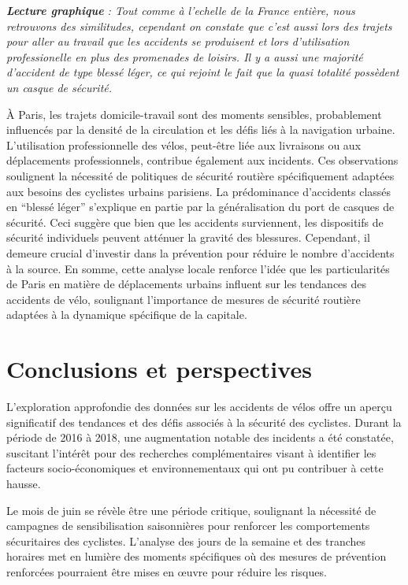 \documentclass[french,]{compterendu}
\theoremstyle{urcastyle}
\theoremstyle{remark}
\begin{document}
\emph{\textbf{Lecture graphique} : Tout comme à l'echelle de la France entière, nous retrouvons des similitudes, cependant on constate que c'est aussi lors des trajets pour aller au travail que les accidents se produisent et lors d'utilisation professionelle en plus des promenades de loisirs. Il y a aussi une majorité d'accident de type blessé léger, ce qui rejoint le fait que la quasi totalité possèdent un casque de sécurité.}

À Paris, les trajets domicile-travail sont des moments sensibles, probablement influencés par la densité de la circulation et les défis liés à la navigation urbaine. L'utilisation professionnelle des vélos, peut-être liée aux livraisons ou aux déplacements professionnels, contribue également aux incidents. Ces observations soulignent la nécessité de politiques de sécurité routière spécifiquement adaptées aux besoins des cyclistes urbains parisiens.
La prédominance d'accidents classés en ``blessé léger'' s'explique en partie par la généralisation du port de casques de sécurité. Ceci suggère que bien que les accidents surviennent, les dispositifs de sécurité individuels peuvent atténuer la gravité des blessures. Cependant, il demeure crucial d'investir dans la prévention pour réduire le nombre d'accidents à la source.
En somme, cette analyse locale renforce l'idée que les particularités de Paris en matière de déplacements urbains influent sur les tendances des accidents de vélo, soulignant l'importance de mesures de sécurité routière adaptées à la dynamique spécifique de la capitale.

\hypertarget{conclusions-et-perspectives}{%
\section{Conclusions et perspectives}\label{conclusions-et-perspectives}}

L'exploration approfondie des données sur les accidents de vélos offre un aperçu significatif des tendances et des défis associés à la sécurité des cyclistes. Durant la période de 2016 à 2018, une augmentation notable des incidents a été constatée, suscitant l'intérêt pour des recherches complémentaires visant à identifier les facteurs socio-économiques et environnementaux qui ont pu contribuer à cette hausse.

Le mois de juin se révèle être une période critique, soulignant la nécessité de campagnes de sensibilisation saisonnières pour renforcer les comportements sécuritaires des cyclistes. L'analyse des jours de la semaine et des tranches horaires met en lumière des moments spécifiques où des mesures de prévention renforcées pourraient être mises en œuvre pour réduire les risques.
\end{document}
